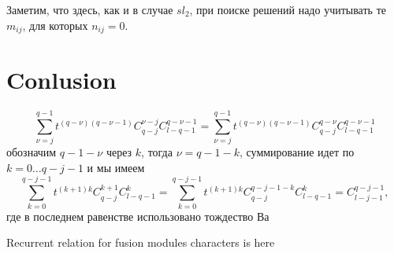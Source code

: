 \documentclass[12pt]{iopart}
\begin{document}
Заметим, что здесь, как и в случае $sl_{2}$, при поиске решений надо учитывать те $m_{ij}$, для
которых $n_{ij}=0$. 


\section*{Conlusion}
\label{sec:conlusion}


\begin{equation}
  \label{eq:17}
  \sum_{\nu=j}^{q-1} t^{(q-\nu)(q-\nu-1)} C_{q-j}^{\nu-j} C_{l-q-1}^{q-\nu-1} = 
  \sum_{\nu=j}^{q-1} t^{(q-\nu)(q-\nu-1)} C_{q-j}^{q-\nu} C_{l-q-1}^{q-\nu-1} 
\end{equation}
обозначим $q-1-\nu$ через $k$, тогда $\nu=q-1-k$, суммирование идет по $k=0\dots q-j-1$ и мы имеем
\begin{equation}
  \label{eq:18}
  \sum_{k=0}^{q-j-1} t^{(k+1)k} C_{q-j}^{k+1} C_{l-q-1}^{k} =   \sum_{k=0}^{q-j-1} t^{(k+1)k} C_{q-j}^{q-j-1-k} C_{l-q-1}^{k} = C_{l-j-1}^{q-j-1},
\end{equation}
где в последнем равенстве использовано тождество Ва
\cite{di2013quantum} 

Recurrent relation for fusion modules characters is here \cite{di2015difference}
{} 

\end{document}
